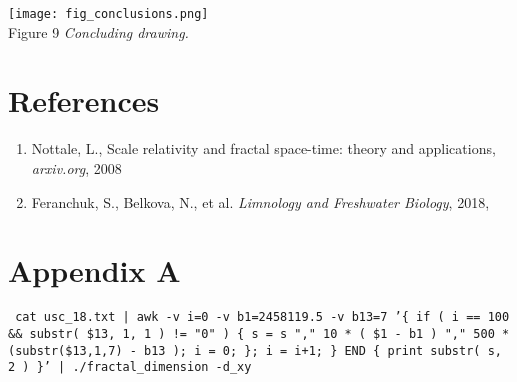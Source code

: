 \documentclass[a4paper]{article}
\begin{document}
\vskip 12pt

\texttt{[image: fig\_conclusions.png]}\\
Figure 9 \textit{Concluding drawing.}

\section*{References}

\begin{enumerate}

\item Nottale, L., Scale relativity and fractal space-time: theory and applications, \textit{arxiv.org}, 2008

\item Feranchuk, S., Belkova, N., et al. \textit{Limnology and Freshwater Biology}, 2018,

\end{enumerate}

\newpage
\section*{Appendix A}


\texttt{\small{ cat usc\_18.txt | awk -v i=0 -v b1=2458119.5 -v b13=7 '\{ if ( i == 100 \&\& substr( \$13, 1, 1 ) != "0" ) \{ s = s "," 10 * ( \$1 - b1 ) "," 500 * (substr(\$13,1,7) - b13 ); i = 0; \}; i = i+1; \} END \{ print substr( s, 2 ) \}' | ./fractal\_dimension -d\_xy }}





\end{document}
